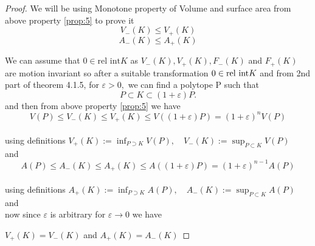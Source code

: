 \documentclass[oneside]{book}
\begin{document}
       
\begin{proof}
We will be using Monotone property of Volume and surface area from above property \ref{prop:5} to prove it \\


$$V_{-}(K) \leq V_{+}(K)  $$  $$ A_{-}(K) \leq A_{+}(K)$$

We can assume that $0 \in \text{rel int} K$ as  $V_{-}(K), V_{+}(K), F_{-}(K)$ and $F_{+}(K)$ are \newline motion invariant so after a suitable transformation
 $0 \in \text{\text{\text{rel int}}} K$ 
 and from 2nd part of theorem 4.1.5,
for $\varepsilon>0,$ we can find a polytope P such that 
$$P \subset K \subset(1+\varepsilon) P .$$
\newpage
and then from above property \ref{prop:5} we have \\ 
\[
V(P) \leq V_{-}(K) \leq V_{+}(K) \leq V((1+\varepsilon) P)=(1+\varepsilon)^{n} V(P)
\] \\
using definitions $ V_{+}(K):=\inf _{P \supset K} V(P), \quad V_{-}(K):=\sup _{P \subset K} V(P)$ \\
and   \\
\[
A(P) \leq A_{-}(K) \leq A_{+}(K) \leq A((1+\varepsilon) P)=(1+\varepsilon)^{n-1} A(P)
\]  \\using definitions 
$ A_{+}(K):=\inf _{P \supset K} A(P), \quad A_{-}(K):=\sup _{P \subset K} A(P) $
 and \\ 
 
 now since $\varepsilon $ is arbitrary for $\varepsilon \rightarrow 0$ we have 
 
 $V_{+}(K)=V_{-}(K)$ and  $A_{+}(K)=A_{-}(K)$
 \end{proof}
 
\end{document}
